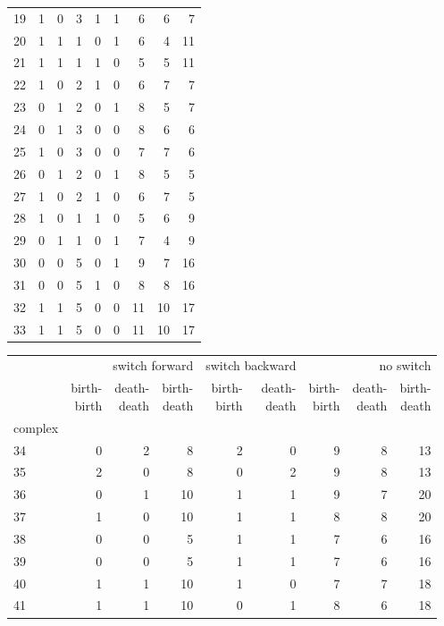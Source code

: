 \documentclass{article}
\begin{document}
\begin{center}
\begin{tabular}{lrrrrrrrr}
19 & 1 & 0 & 3 & 1 & 1 & 6 & 6 & 7 \\
20 & 1 & 1 & 1 & 0 & 1 & 6 & 4 & 11 \\
21 & 1 & 1 & 1 & 1 & 0 & 5 & 5 & 11 \\
22 & 1 & 0 & 2 & 1 & 0 & 6 & 7 & 7 \\
23 & 0 & 1 & 2 & 0 & 1 & 8 & 5 & 7 \\
24 & 0 & 1 & 3 & 0 & 0 & 8 & 6 & 6 \\
25 & 1 & 0 & 3 & 0 & 0 & 7 & 7 & 6 \\
26 & 0 & 1 & 2 & 0 & 1 & 8 & 5 & 5 \\
27 & 1 & 0 & 2 & 1 & 0 & 6 & 7 & 5 \\
28 & 1 & 0 & 1 & 1 & 0 & 5 & 6 & 9 \\
29 & 0 & 1 & 1 & 0 & 1 & 7 & 4 & 9 \\
30 & 0 & 0 & 5 & 0 & 1 & 9 & 7 & 16 \\
31 & 0 & 0 & 5 & 1 & 0 & 8 & 8 & 16 \\
32 & 1 & 1 & 5 & 0 & 0 & 11 & 10 & 17 \\
33 & 1 & 1 & 5 & 0 & 0 & 11 & 10 & 17 \\
\bottomrule
\end{tabular}

\begin{tabular}{lrrrrrrrr}
\toprule
& \multicolumn{3}{r}{switch forward} & \multicolumn{2}{r}{switch backward} & \multicolumn{3}{r}{no switch} \\
& \makecell{birth-\\birth} & \makecell{death-\\death} & \makecell{birth-\\death} & \makecell{birth-\\birth} & \makecell{death-\\death} & \makecell{birth-\\birth} & \makecell{death-\\death} & \makecell{birth-\\death} \\
complex &  &  &  &  &  &  &  &  \\
\midrule
34 & 0 & 2 & 8 & 2 & 0 & 9 & 8 & 13 \\
35 & 2 & 0 & 8 & 0 & 2 & 9 & 8 & 13 \\
36 & 0 & 1 & 10 & 1 & 1 & 9 & 7 & 20 \\
37 & 1 & 0 & 10 & 1 & 1 & 8 & 8 & 20 \\
38 & 0 & 0 & 5 & 1 & 1 & 7 & 6 & 16 \\
39 & 0 & 0 & 5 & 1 & 1 & 7 & 6 & 16 \\
40 & 1 & 1 & 10 & 1 & 0 & 7 & 7 & 18 \\
41 & 1 & 1 & 10 & 0 & 1 & 8 & 6 & 18 \\
\bottomrule
\end{tabular}

\end{center}
\end{document}
